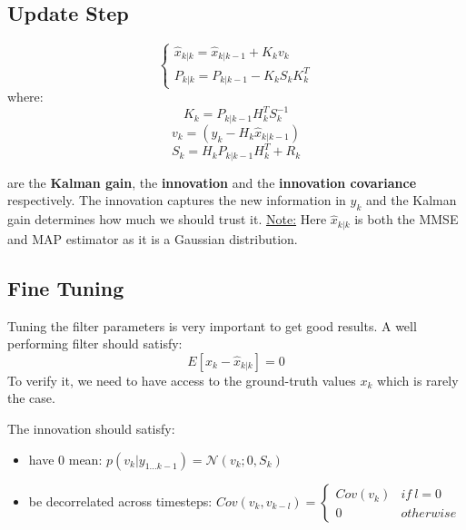 \subsection{Update Step}
\begin{equation}
    \left\{\begin{array}{c}
        \hat{x}_{k|k} = \hat{x}_{k|k-1} + K_k v_k \\
        P_{k|k} = P_{k|k-1} - K_k S_k K_k^T
    \end{array}\right.
\end{equation}
where:
\begin{equation}
    K_k = P_{k|k-1} H_k^T S_k^{-1}
\end{equation}
\begin{equation}
    v_k = (y_k - H_k \hat{x}_{k|k-1})
\end{equation}
\begin{equation}
    S_k = H_k P_{k|k-1} H_k^T + R_k
\end{equation}

are the \textbf{Kalman gain}, the \textbf{innovation} and the \textbf{innovation covariance} respectively.
The innovation captures the new information in $y_k$ and the Kalman gain determines how much we should trust it.
\underline{Note:} Here $\hat{x}_{k|k}$ is both the MMSE and MAP estimator as it is a Gaussian distribution.

\subsection{Fine Tuning}
Tuning the filter parameters is very important to get good results.
A well performing filter should satisfy:
\begin{equation}
    E[x_k - \hat{x}_{k|k}] = 0
\end{equation}
To verify it, we need to have access to the ground-truth values $x_k$ which is rarely the case.


The innovation should satisfy:
\begin{itemize}
    \item have 0 mean: $p(v_k|y_{1\dots k-1}) = \mathcal{N}(v_k; 0, S_k)$
    \item be decorrelated across timesteps: $Cov(v_k, v_{k-l}) = \left\{\begin{array}{cc}
        Cov(v_k) & if\:l=0\\
        0 & otherwise
    \end{array}\right.$
\end{itemize}

